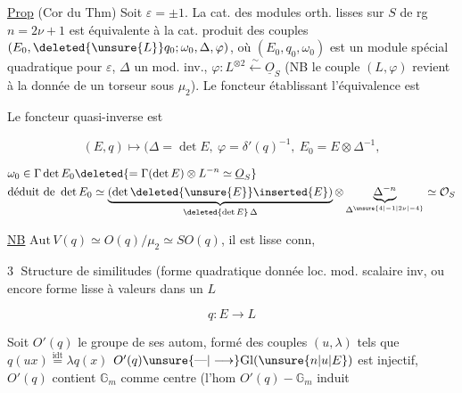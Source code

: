 
\uline{Prop} (Cor du Thm) Soit $\varepsilon=\pm1$. La cat. des modules orth. lisses  sur $S$ de rg $n=2\nu+1$ est équivalente à la cat. produit des couples $(E_0,\deleted{\unsure{L}}q_0;\omega_0,\Delta,\varphi)$, où $(E_0,q_0,\omega_0)$ est un module spécial quadratique pour $\varepsilon$,  $\Delta$ un mod. inv., $\varphi:L^{\otimes2}\overset{\sim}{\longleftarrow}\underline O_S$ (NB le couple $(L,\varphi)$ revient à la donnée de un torseur sous $\mu_2$). Le foncteur établissant l'équivalence est


Le foncteur quasi-inverse est

\[
 (E,q)\longmapsto\bigl(\Delta=\det E,\ \varphi=\delta'(q)^{-1},\ E_0=E\otimes\Delta^{-1},
\]


\[
 \begin{aligned}
 &\omega_0\in\Gamma\det E_0\deleted{=\Gamma(\det E)\otimes L^{-n}\simeq\underline O_S}\\
 &\text{déduit de }\det E_0\simeq
 \underbrace{(\det \deleted{\unsure{E}}\inserted{E})}_{\deleted{\det E}\,\Delta}\otimes
 \underbrace{\Delta^{-n}}_{\Delta^{\unsure{4|-1|2\nu|-4}}}\simeq\mathcal O_S
 \end{aligned}
\]

\uline{NB} $\mathrm{Aut}\,V(q)\simeq O(q)/\mu_2\simeq SO(q)$, il est lisse conn,

\quad{}

\textcircled{3} Structure de similitudes (forme quadratique  donnée loc. mod. scalaire inv, ou encore forme lisse à valeurs dans un $L$

\[
 q:E\longrightarrow L
\]

Soit $O'(q)$ le groupe de ses autom,  formé des couples $(u,\lambda)$ tels que $q(ux)\overset{\mathrm{idt}}{=}\lambda q(x)$  $O'(q)\unsure{\text{---}|\longrightarrow}\mathrm{Gl}(\unsure{n|u|E})$ est injectif, $O'(q)$ contient $\mathbb G_m$ comme centre (l'hom $O'(q)\mathbin{-}\mathbb G_m$ induit

